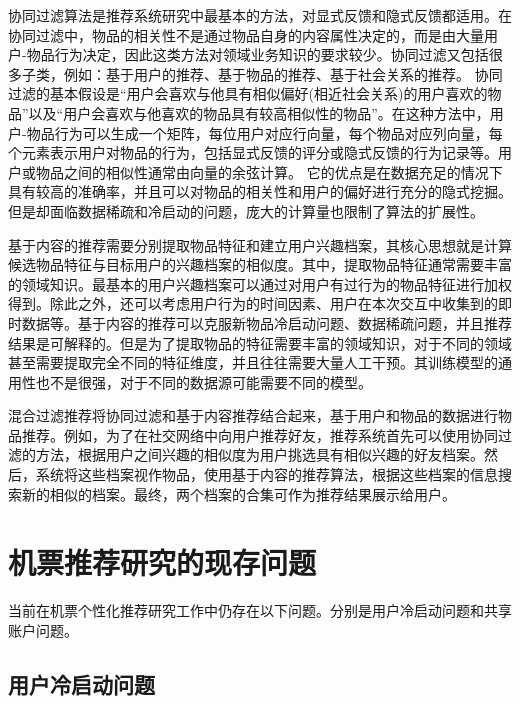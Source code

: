协同过滤算法是推荐系统研究中最基本的方法，对显式反馈和隐式反馈都适用。在协同过滤中，物品的相关性不是通过物品自身的内容属性决定的，而是由大量用户-物品行为决定，因此这类方法对领域业务知识的要求较少。协同过滤又包括很多子类，例如：基于用户的推荐\cite{babu2011implementation}、基于物品的推荐\cite{sarwar2001item,linden2003amazon}、基于社会关系的推荐\cite{asabere2015socially,massa2007trust}。
协同过滤的基本假设是“用户会喜欢与他具有相似偏好(相近社会关系)的用户喜欢的物品”以及“用户会喜欢与他喜欢的物品具有较高相似性的物品”。在这种方法中，用户-物品行为可以生成一个矩阵，每位用户对应行向量，每个物品对应列向量，每个元素表示用户对物品的行为，包括显式反馈的评分或隐式反馈的行为记录等。用户或物品之间的相似性通常由向量的余弦\cite{goshtasby2012similarity}计算。
它的优点是在数据充足的情况下具有较高的准确率，并且可以对物品的相关性和用户的偏好进行充分的隐式挖掘。但是却面临数据稀疏和冷启动的问题，庞大的计算量也限制了算法的扩展性。
		
基于内容的推荐需要分别提取物品特征和建立用户兴趣档案，其核心思想就是计算候选物品特征与目标用户的兴趣档案的相似度。其中，提取物品特征通常需要丰富的领域知识。最基本的用户兴趣档案可以通过对用户有过行为的物品特征进行加权得到。除此之外，还可以考虑用户行为的时间因素、用户在本次交互中收集到的即时数据等。基于内容的推荐可以克服新物品冷启动问题、数据稀疏问题，并且推荐结果是可解释的。但是为了提取物品的特征需要丰富的领域知识，对于不同的领域甚至需要提取完全不同的特征维度，并且往往需要大量人工干预。其训练模型的通用性也不是很强，对于不同的数据源可能需要不同的模型。

混合过滤推荐将协同过滤和基于内容推荐结合起来，基于用户和物品的数据进行物品推荐。例如，为了在社交网络中向用户推荐好友\cite{portugal2015use}，推荐系统首先可以使用协同过滤的方法，根据用户之间兴趣的相似度为用户挑选具有相似兴趣的好友档案。然后，系统将这些档案视作物品，使用基于内容的推荐算法，根据这些档案的信息搜索新的相似的档案。最终，两个档案的合集可作为推荐结果展示给用户。

\section{机票推荐研究的现存问题}


当前在机票个性化推荐研究工作中仍存在以下问题。分别是用户冷启动问题\cite{schein2002methods}和共享账户问题\cite{weston2013nonlinear}。

\subsection{用户冷启动问题}

